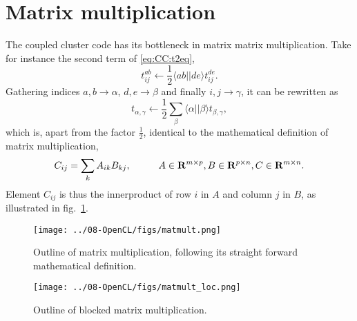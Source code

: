 \section{Matrix multiplication}
\label{sec:OpenCL:matmult}
The coupled cluster code has its bottleneck in matrix matrix multiplication.
Take for instance the second term of \eqref{eq:CC:t2eq},
\begin{equation}
t_{ij}^{ab} \leftarrow \frac{1}{2} \langle ab||de \rangle t^{de}_{ij} .
\end{equation}
Gathering indices $a,b \rightarrow \alpha$, $d,e \rightarrow \beta$ and finally $i,j \rightarrow \gamma$, it can be rewritten as
\begin{equation}
t_{\alpha,\gamma} \leftarrow \frac{1}{2} \sum_{\beta} \langle \alpha||\beta \rangle t_{\beta,\gamma} ,
\end{equation}
which is, apart from the factor $\frac{1}{2}$, identical to the mathematical definition of matrix multiplication,
\begin{equation}
C_{ij} = \sum_k A_{ik} B_{kj},
\hspace{10mm}
A \in \mathbf{R}^{m\times p}, B \in \mathbf{R}^{p\times n}, C \in \mathbf{R}^{m\times n}.
\end{equation}
Element $C_{ij}$ is thus the innerproduct of row $i$ in $A$ and column $j$ in $B$, as illustrated in fig.~\ref{fig:OpenCL:matmult}.


\begin{figure}
\begin{center}
\texttt{[image: ../08-OpenCL/figs/matmult.png]}
\caption{Outline of matrix multiplication, following its straight forward mathematical definition.}
\label{fig:OpenCL:matmult}
\end{center}
\end{figure}


\begin{figure}
\begin{center}
\texttt{[image: ../08-OpenCL/figs/matmult\_loc.png]}
\caption{Outline of blocked matrix multiplication.}
\label{fig:OpenCL:matmult_loc}
\end{center}
\end{figure}



